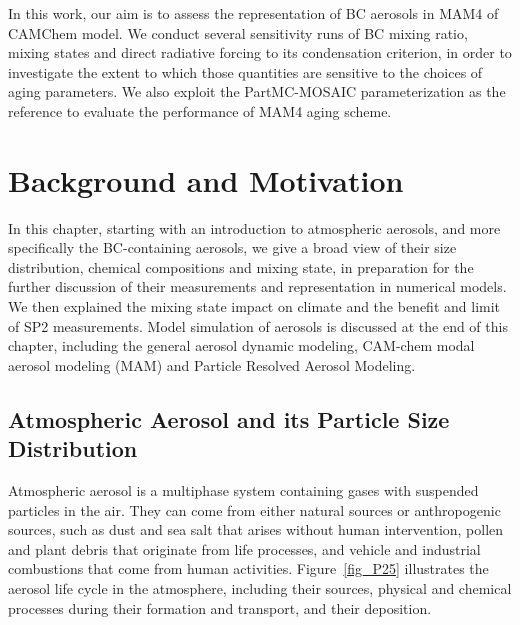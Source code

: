 \documentclass[12pt, fullpage]{uiucthesis2009}
\begin{document}
	In this work, our aim is to assess the representation of BC aerosols in MAM4 of CAMChem model. We conduct several sensitivity runs of BC mixing ratio, mixing states and direct radiative forcing to its condensation criterion, in order to investigate the extent to which those quantities are sensitive to the choices of aging parameters. We also exploit the PartMC-MOSAIC parameterization as the reference to evaluate the performance of MAM4 aging scheme. 
	
	\chapter{Background and Motivation}
	In this chapter, starting with an introduction to atmospheric aerosols, and more specifically the BC-containing aerosols, we give a broad view of their size distribution, chemical compositions and mixing state, in preparation for the further discussion of their measurements and representation in numerical models. We then explained the mixing state impact on climate and the benefit and limit of SP2 measurements. Model simulation of aerosols is discussed at the end of this chapter, including the general aerosol dynamic modeling, CAM-chem modal aerosol modeling (MAM) and Particle Resolved Aerosol Modeling.
	
	\section{Atmospheric Aerosol and its Particle Size Distribution}
	Atmospheric aerosol is a multiphase system containing gases with suspended particles in the air. They can come from either natural sources or anthropogenic sources, such as dust and sea salt that arises without human intervention, pollen and plant debris that originate from life processes, and vehicle and industrial combustions that come from human activities. Figure~\ref{fig_P25} illustrates the aerosol life cycle in the atmosphere, including their sources, physical and chemical processes during their formation and transport, and their deposition. 
	
\end{document}
